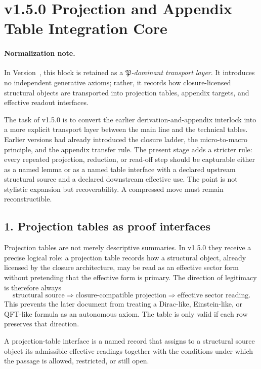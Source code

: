 \section*{v1.5.0 Projection and Appendix Table Integration Core}

\paragraph{Normalization note.} In Version~\docversion, this block is retained as a \emph{$\mathfrak P$-dominant transport layer}. It introduces no independent generative axioms; rather, it records how closure-licensed structural objects are transported into projection tables, appendix targets, and effective readout interfaces.


The task of v1.5.0 is to convert the earlier derivation-and-appendix
interlock into a more explicit transport layer between the main line and the
technical tables. Earlier versions had already introduced the closure ladder,
the micro-to-macro principle, and the appendix transfer rule. The present stage
adds a stricter rule: every repeated projection, reduction, or read-off step
should be capturable either as a named lemma or as a named table interface with
a declared upstream structural source and a declared downstream effective use.
The point is not stylistic expansion but recoverability. A compressed move must
remain reconstructible.

\subsection*{1. Projection tables as proof interfaces}
Projection tables are not merely descriptive summaries. In v1.5.0 they
receive a precise logical role: a projection table records how a structural
object, already licensed by the closure architecture, may be read as an
effective sector form without pretending that the effective form is primary.
The direction of legitimacy is therefore always
\[
\text{structural source} \Longrightarrow \text{closure-compatible projection}
\Longrightarrow \text{effective sector reading.}
\]
This prevents the later document from treating a Dirac-like, Einstein-like, or
QFT-like formula as an autonomous axiom. The table is only valid if each row
preserves that direction.

\begin{definition}
A projection-table interface is a named record that assigns to a structural
source object its admissible effective readings together with the conditions
under which the passage is allowed, restricted, or still open.
\end{definition}

